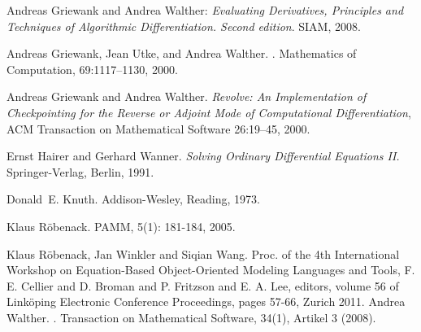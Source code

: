 \documentclass[11pt,twoside]{article}
\begin{document}
\begin{thebibliography}{10}
Andreas Griewank and Andrea Walther: {\em Evaluating Derivatives, Principles and Techniques of
  Algorithmic Differentiation. Second edition}. SIAM, 2008.


Andreas Griewank, Jean Utke, and Andrea Walther.
.
\newblock Mathematics of Computation, 69:1117--1130, 2000.

Andreas Griewank and Andrea Walther. {\em Revolve: An Implementation of Checkpointing for the Reverse
                 or Adjoint Mode of Computational Differentiation},
		 ACM Transaction on Mathematical Software 26:19--45, 2000.

    Ernst Hairer and Gerhard Wanner.
    {\it Solving Ordinary Differential Equations II.\/}
    Springer-Verlag, Berlin, 1991.

Donald~E. Knuth.
\newblock Addison-Wesley, Reading, 1973.

Klaus R\"{o}benack.
\newblock PAMM, 5(1): 181-184, 2005.

Klaus R\"{o}benack, Jan Winkler and Siqian Wang.
\newblock Proc. of the 4th International Workshop on Equation-Based Object-Oriented
          Modeling Languages and Tools, F. E. Cellier and D. Broman and P. Fritzson 
	  and E. A. Lee, editors, volume 56 of Link\"oping Electronic Conference Proceedings,
	  pages 57-66, Zurich 2011.
Andrea Walther.
.
\newblock Transaction on Mathematical Software, 34(1), Artikel 3 (2008).
\end{thebibliography}
\end{document}
